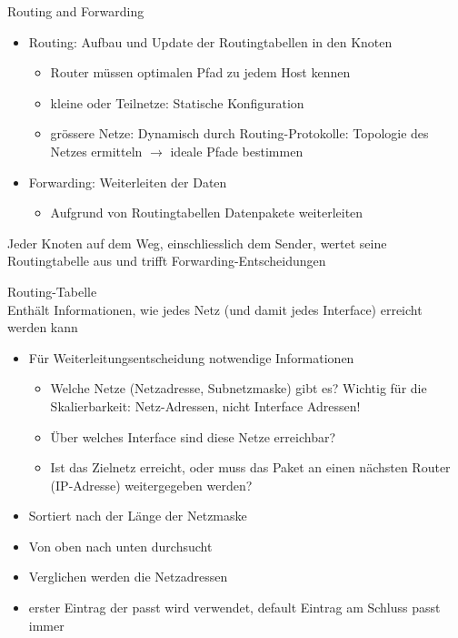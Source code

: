 \begin{concept}{Routing and Forwarding}
    \begin{itemize}
        \item Routing: Aufbau und Update der Routingtabellen in den Knoten
            \begin{itemize}
                \item Router müssen optimalen Pfad zu jedem Host kennen
                \item kleine oder Teilnetze: Statische Konfiguration
                \item grössere Netze: Dynamisch durch Routing-Protokolle: Topologie des Netzes ermitteln $\rightarrow$ ideale Pfade bestimmen
            \end{itemize}
        \item Forwarding: Weiterleiten der Daten
        \begin{itemize}
            \item Aufgrund von Routingtabellen Datenpakete weiterleiten
        \end{itemize}
    \end{itemize}
    Jeder Knoten auf dem Weg, einschliesslich dem Sender, wertet seine Routingtabelle aus und trifft Forwarding-Entscheidungen
\end{concept}

\begin{definition}{Routing-Tabelle}\\
    Enthält Informationen, wie jedes Netz (und damit jedes Interface) erreicht werden kann
    \begin{itemize}
        \item Für Weiterleitungsentscheidung notwendige Informationen
        \begin{itemize}
            \item Welche Netze (Netzadresse, Subnetzmaske) gibt es? Wichtig für die Skalierbarkeit: Netz-Adressen, nicht Interface Adressen!
            \item Über welches Interface sind diese Netze erreichbar?
            \item Ist das Zielnetz erreicht, oder muss das Paket an einen nächsten Router (IP-Adresse) weitergegeben werden?
        \end{itemize}
        \item Sortiert nach der Länge der Netzmaske
        \item Von oben nach unten durchsucht
        \item Verglichen werden die Netzadressen
        \item erster Eintrag der passt wird verwendet, default Eintrag am Schluss passt immer
    \end{itemize}
\end{definition}

